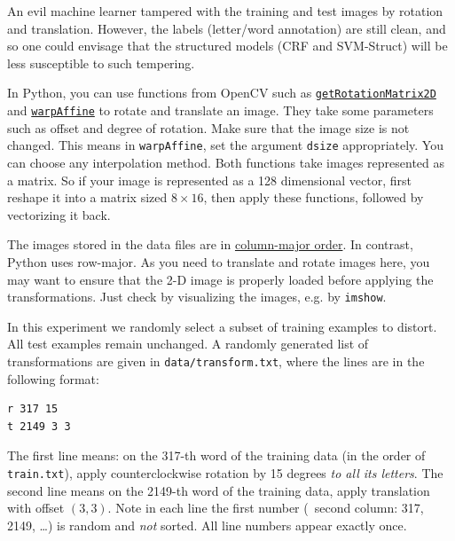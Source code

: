 \documentclass[11pt]{report}
\begin{document}
An evil machine learner tampered with the training and test images by rotation and translation.
However, the labels (letter/word annotation) are still clean, and so
one could envisage that the structured models (CRF and SVM-Struct) will be less susceptible to such tempering.



In Python, you can use functions from OpenCV such as
\href{https://docs.opencv.org/3.4/da/d54/group__imgproc__transform.html#gafbbc470ce83812914a70abfb604f4326}{\texttt{getRotationMatrix2D}} and \href{https://docs.opencv.org/3.4/da/d54/group__imgproc__transform.html#ga0203d9ee5fcd28d40dbc4a1ea4451983}{\texttt{warpAffine}} to rotate and translate an image. 
They take some parameters such as offset and degree of rotation.
Make sure that the image size is not changed. 
This means in \texttt{warpAffine}, set the argument \verb#dsize# appropriately.
You can choose any interpolation method.
%
Both functions take images represented as a matrix.
So if your image is represented as a 128 dimensional vector,
first reshape it into a matrix sized $8 \times 16$,
then apply these functions,
followed by vectorizing it back.

The images stored in the data files are in \href{https://en.wikipedia.org/wiki/Row-_and_column-major_order}{column-major order}.
In contrast, Python uses row-major.
As you need to translate and rotate images here, 
you may want to ensure that the 2-D image is properly loaded before applying the transformations.  
Just check by visualizing the images, e.g. by \verb#imshow#.	

In this experiment
we randomly select a subset of training examples to distort.
All test examples remain unchanged.
A randomly generated list of transformations are given in \verb#data/transform.txt#, where the lines are in the following format:
%
\begin{verbatim}
r 317 15
t 2149 3 3
\end{verbatim}
The first line means: on the 317-th word of the training data (in the order of \verb#train.txt#),
apply counterclockwise rotation by 15 degrees \emph{to all its letters}.
The second line means on the 2149-th word of the training data, apply translation with offset $(3,3)$.
Note in each line the first number (\ie\ second column: 317, 2149, \ldots) is random and \emph{not} sorted.
All line numbers appear exactly once.
\end{document}
